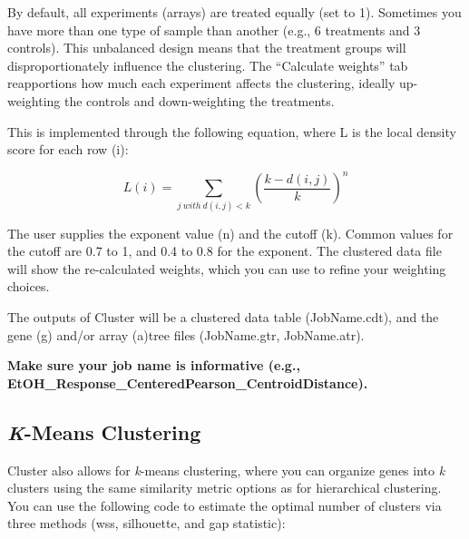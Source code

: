 \documentclass[
]{book}
\begin{document}
By default, all experiments (arrays) are treated equally (set to 1). Sometimes you have more than one type of sample than another (e.g., 6 treatments and 3 controls). This unbalanced design means that the treatment groups will disproportionately influence the clustering. The ``Calculate weights'' tab reapportions how much each experiment affects the clustering, ideally up-weighting the controls and down-weighting the treatments.

This is implemented through the following equation, where L is the local density score for each row (i):

\[
L(i) = \sum_{j\ with\ d(i,j)<k} (\frac{k-d(i,j)}{k})^n
\]

The user supplies the exponent value (n) and the cutoff (k). Common values for the cutoff are 0.7 to 1, and 0.4 to 0.8 for the exponent. The clustered data file will show the re-calculated weights, which you can use to refine your weighting choices.

The outputs of Cluster will be a clustered data table (JobName.cdt), and the gene (g) and/or array (a)tree files (JobName.gtr, JobName.atr).

\textbf{Make sure your job name is informative (e.g., EtOH\_Response\_CenteredPearson\_CentroidDistance).}

\hypertarget{k-means-clustering}{%
\subsection{\texorpdfstring{\emph{K}-Means Clustering}{K-Means Clustering}}\label{k-means-clustering}}

Cluster also allows for \emph{k}-means clustering, where you can organize genes into \emph{k} clusters using the same similarity metric options as for hierarchical clustering. You can use the following code to estimate the optimal number of clusters via three methods (wss, silhouette, and gap statistic):
\end{document}

